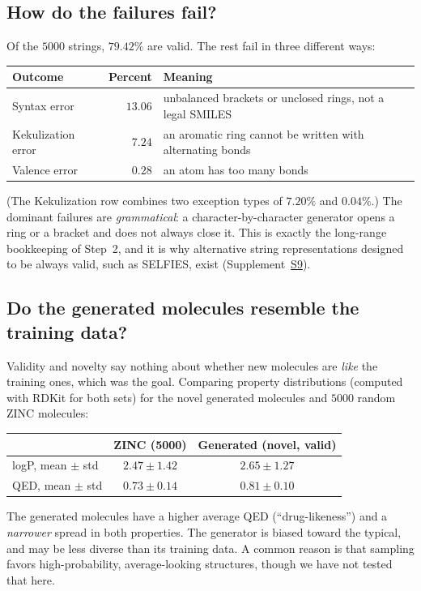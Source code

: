 \documentclass[11pt]{article}
\begin{document}
\subsection*{How do the failures fail?}
Of the $5000$ strings, $79.42\%$ are valid. The rest fail in three different ways:

\begin{center}
\small
\begin{tabular}{@{}lrl@{}}
\toprule
Outcome & Percent & Meaning\\
\midrule
Syntax error & $13.06$ & unbalanced brackets or unclosed rings, not a legal SMILES\\
Kekulization error & $7.24$ & an aromatic ring cannot be written with alternating bonds\\
Valence error & $0.28$ & an atom has too many bonds\\
\bottomrule
\end{tabular}
\end{center}

(The Kekulization row combines two exception types of $7.20\%$ and $0.04\%$.) The dominant failures are \emph{grammatical}: a character-by-character generator opens a ring or a bracket and does not always close it. This is exactly the long-range bookkeeping of Step~2, and it is why alternative string representations designed to be always valid, such as SELFIES, exist (Supplement~\hyperref[sec:S9]{S9}).

\subsection*{Do the generated molecules resemble the training data?}
Validity and novelty say nothing about whether new molecules are \emph{like} the training ones, which was the goal. Comparing property distributions (computed with RDKit for both sets) for the novel generated molecules and $5000$ random ZINC molecules:

\begin{center}
\begin{tabular}{@{}lcc@{}}
\toprule
 & ZINC (5000) & Generated (novel, valid)\\
\midrule
logP, mean $\pm$ std & $2.47\pm1.42$ & $2.65\pm1.27$\\
QED, mean $\pm$ std & $0.73\pm0.14$ & $0.81\pm0.10$\\
\bottomrule
\end{tabular}
\end{center}

The generated molecules have a higher average QED (``drug-likeness'') and a \emph{narrower} spread in both properties. The generator is biased toward the typical, and may be less diverse than its training data. A common reason is that sampling favors high-probability, average-looking structures, though we have not tested that here.
\end{document}
